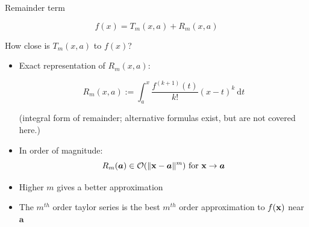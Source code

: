 \begin{vbframe}{Remainder term}

$$
  f(x) = T_m(x, a) + R_m(x, a)
$$

How close is $T_m(x,a)$ to $f(x)$?

\begin{itemize}
  \item Exact representation of $R_m(x,a)$:

  $$
    R_{m}(x, a) := \int_{a}^{x} \frac{f^{(k + 1)}(t)}{k!}(x - t)^k~\text{d}t
  $$
  \begin{footnotesize}
  (integral form of remainder; alternative formulas exist, but are not covered here.)
  \end{footnotesize}

  \item In order of magnitude: 
  $$
    R_{m}(\bm{a}) \in \mathcal{O}(\|\mathbf{x} - \bm{a}\|^m) \text{ for } \mathbf{x} \to \bm{a}
  $$
\end{itemize}

\framebreak 

\begin{itemize}
  \item Higher $m$ gives a better approximation
  \item The $m^{th}$ order taylor series is the best $m^{th}$ order approximation to $f(\mathbf{x})$ near $\bm{a}$
\end{itemize}



\end{vbframe}
